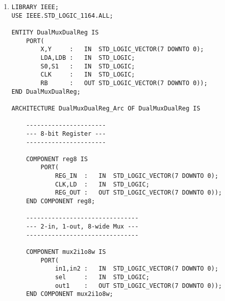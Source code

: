\begin{enumerate}
\begin{lstlisting}
	COMPONENT decoder1to2 IS
		PORT(
			in1			:	IN	STD_LOGIC;
			out0,out1	:	OUT	STD_LOGIC);
	END COMPONENT decoder1to2;

	
	----------------------
	--- 8-bit Register ---
	----------------------

	COMPONENT reg8 IS
		PORT(
			REG_IN	:	IN	STD_LOGIC_VECTOR(7 DOWNTO 0);
			CLK,LD	:	IN	STD_LOGIC;
			REG_OUT	:	OUT	STD_LOGIC_VECTOR(7 DOWNTO 0));
	END COMPONENT reg8;
	
	SIGNAL muxout,regAout,regBout	:	STD_LOGIC_VECTOR(7 DOWNTO 0);
	SIGNAL decout0,decout1			:	STD_LOGIC;

BEGIN
	
	mux:	mux4i1o8w PORT MAP (
		in0		=>	regBout,
		in1		=>	Z,
		in2		=>	Y,
		in3		=>	X,
		sel		=>	MS,
		out1	=> muxout);
		
	dec:	decoder1to2 PORT MAP (
		in1		=>	DS,
		out0	=>	decout0,
		out1	=>	decout1);
		
	regA:	reg8 PORT MAP (
		REG_IN	=>	muxout,
		CLK		=>	CLK,
		LD		=>	decout0,
		REG_OUT	=>	regAout);
		
	regB:	reg8 PORT MAP (
		REG_IN	=>	regAout,
		CLK		=>	CLK,
		LD		=>	decout1,
		REG_OUT	=>	regBout);
	
	RA <= regAout;
	RB <= regBout;
	
END muxdec2r;
	\end{lstlisting}
	
	\item \begin{lstlisting}
LIBRARY IEEE;
USE IEEE.STD_LOGIC_1164.ALL;

ENTITY DualMuxDualReg IS
	PORT(
		X,Y		:	IN	STD_LOGIC_VECTOR(7 DOWNTO 0);
		LDA,LDB	:	IN	STD_LOGIC;
		S0,S1	:	IN	STD_LOGIC;
		CLK		:	IN	STD_LOGIC;
		RB		:	OUT	STD_LOGIC_VECTOR(7 DOWNTO 0));
END DualMuxDualReg;

ARCHITECTURE DualMuxDualReg_Arc OF DualMuxDualReg IS
	
	----------------------
	--- 8-bit Register ---
	----------------------

	COMPONENT reg8 IS
		PORT(
			REG_IN	:	IN	STD_LOGIC_VECTOR(7 DOWNTO 0);
			CLK,LD	:	IN	STD_LOGIC;
			REG_OUT	:	OUT	STD_LOGIC_VECTOR(7 DOWNTO 0));
	END COMPONENT reg8;
	
	-------------------------------
	--- 2-in, 1-out, 8-wide Mux ---
	-------------------------------
	
	COMPONENT mux2i1o8w IS
		PORT(
			in1,in2	:	IN	STD_LOGIC_VECTOR(7 DOWNTO 0);
			sel		:	IN	STD_LOGIC;
			out1	:	OUT	STD_LOGIC_VECTOR(7 DOWNTO 0));
	END COMPONENT mux2i1o8w;
	

\end{lstlisting}
\end{enumerate}
